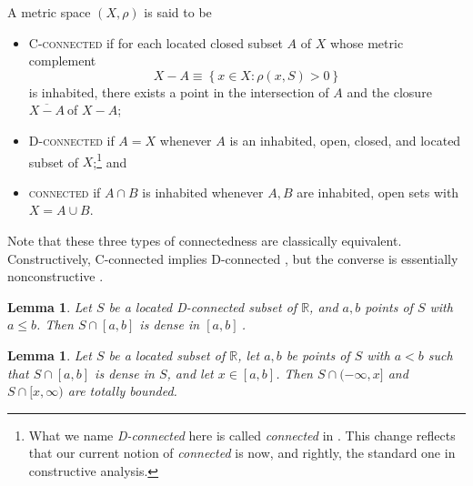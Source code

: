 \documentclass[11pt]{article}%
\newtheorem{lemma}[theorem]{Lemma}
\begin{document}
A metric space $(X,\rho)$ is said to be

\begin{itemize}
\item C-\textsc{connected} if for each located closed subset $A$ of $X$ whose
metric complement%
\[
X-A\equiv\left\{  x\in X:\rho(x,S)>0\right\}
\]
is inhabited, there exists a point in the intersection of $A$ and the closure
$\overline{X-A}\ $of $X-A$;

\item D-\textsc{connected} if $A=X$ whenever $A$ is an inhabited, open,
closed, and located subset of $X$;\footnote{%
\normalfont\sf
What we name \emph{D-connected} here is called \emph{connected} in
\cite{dsb,dsb78a,dsbcon77}. This change reflects that our current notion of
\emph{connected} is now, and rightly, the standard one in constructive
analysis.} and

\item \textsc{connected} if $A\cap B$ is inhabited whenever $A,B$ are
inhabited, open sets with $X=A\cup B$.
\end{itemize}

%

\noindent
Note that these three types of connectedness are classically equivalent.
Constructively, C-connected implies D-connected \cite[2.1]{dsbcon77}, but the
converse is essentially nonconstructive \cite[Thms 3 and 4]{dsb}.

\begin{lemma}
\label{jun03l3}Let $S$ be a located D-connected subset of $\mathbb{R}$, and
$a,b$ points of $S$ with $a\leq b$. Then $S\cap\left[  a,b\right]  $ is dense
in $\left[  a,b\right]  \ $\emph{\cite[3.2]{dsbcon77}}.
\end{lemma}

\begin{lemma}
\label{jun03l2}Let $S$ be a located subset of $\mathbb{R}$, let $a,b$ be
points of $S$ with $a<b$ such that $S\cap\left[  a,b\right]  $ is dense in
$S$, and let $x\in\left[  a,b\right]  $. Then $S\cap(-\infty,x]$ and
$S\cap\lbrack x,\infty)$ are totally bounded.
\end{lemma}
\end{document}

